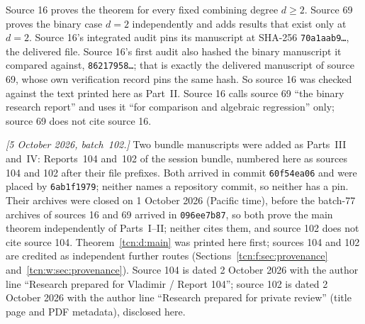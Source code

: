 \documentclass[11pt,letterpaper]{article}
\theoremstyle{remark}
\begin{document}
Source 16 proves the theorem for every fixed combining degree $d\ge2$. Source 69 proves the binary case $d=2$ independently and adds results that exist only at $d=2$. Source 16's integrated audit pins its manuscript at SHA-256 \texttt{70a1aab9\dots}, the delivered file. Source 16's first audit also hashed the binary manuscript it compared against, \texttt{86217958\dots}; that is exactly the delivered manuscript of source 69, whose own verification record pins the same hash. So source 16 was checked against the text printed here as Part~II. Source 16 calls source 69 ``the binary research report'' and uses it ``for comparison and algebraic regression'' only; source 69 does not cite source 16.

\emph{[5 October 2026, batch~102.]} Two bundle manuscripts were added as Parts~III and~IV: Reports~104 and~102 of the session bundle, numbered here as sources 104 and 102 after their file prefixes. Both arrived in commit \texttt{60f54ea06} and were placed by \texttt{6ab1f1979}; neither names a repository commit, so neither has a pin. Their archives were closed on 1 October 2026 (Pacific time), before the batch-77 archives of sources 16 and 69 arrived in \texttt{096ee7b87}, so both prove the main theorem independently of Parts~I--II; neither cites them, and source 102 does not cite source 104. Theorem~\ref{tcn:d:main} was printed here first; sources 104 and 102 are credited as independent further routes (Sections~\ref{tcn:f:sec:provenance} and~\ref{tcn:w:sec:provenance}). Source 104 is dated 2 October 2026 with the author line ``Research prepared for Vladimir / Report 104''; source 102 is dated 2 October 2026 with the author line ``Research prepared for private review'' (title page and PDF metadata), disclosed here.
\end{document}

